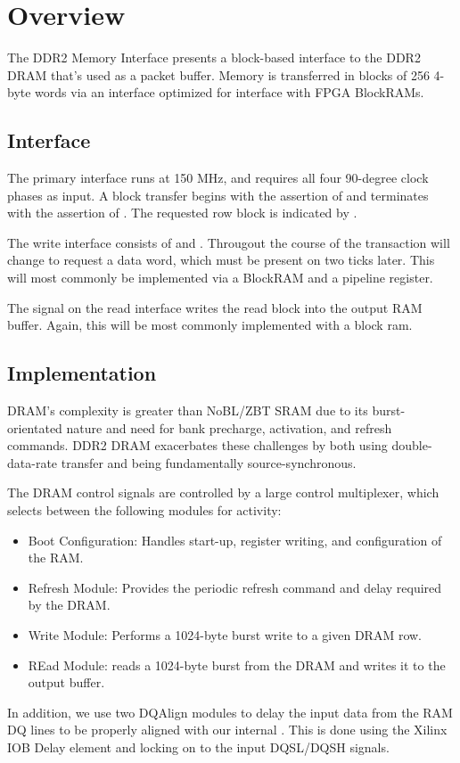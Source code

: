\section{Overview}

The DDR2 Memory Interface presents a block-based interface to the DDR2
DRAM that's used as a packet buffer. Memory is transferred in blocks
of 256 4-byte words via an interface optimized for interface with FPGA
BlockRAMs.


\subsection{Interface}
The primary interface runs at 150 MHz, and requires all four 90-degree
clock phases as input. A block transfer begins with the assertion of
 and terminates with the assertion of . The
requested row block is indicated by .

The write interface consists of  and
. Througout the course of the transaction
 will change to request a data word, which must be
present on  two ticks later. This will most
commonly be implemented via a BlockRAM and a pipeline register.

The  signal on the read interface writes the read block
into the output RAM buffer. Again, this will be most commonly
implemented with a block ram.

\subsection{Implementation} 
DRAM's complexity is greater than NoBL/ZBT SRAM due to its
burst-orientated nature and need for bank precharge, activation, and
refresh commands. DDR2 DRAM exacerbates these challenges by both using
double-data-rate transfer and being fundamentally source-synchronous.

The DRAM control signals are controlled by a large control multiplexer, which selects between the following modules for activity:

\begin{itemize}
\item Boot Configuration: Handles start-up, register writing, and configuration of the RAM. 
\item Refresh Module: Provides the periodic refresh command and delay required by the DRAM. 
\item Write Module: Performs a 1024-byte burst write to a given DRAM row. 
\item REad Module: reads a 1024-byte burst from the DRAM and writes it to the output buffer. 
\end{itemize}

In addition, we use two DQAlign modules to delay the input data from
the RAM DQ lines to be properly aligned with our internal
. This is done using the Xilinx IOB Delay element and
locking on to the input DQSL/DQSH signals.

